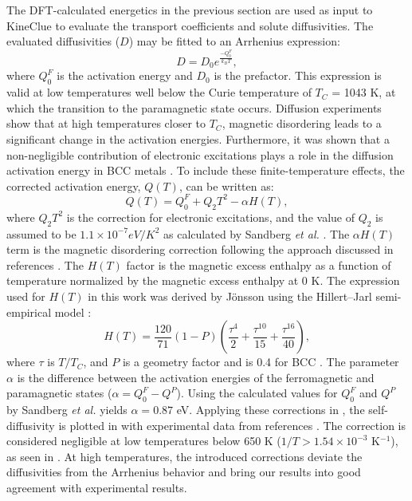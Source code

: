 \documentclass[preprint,12pt]{elsarticle}
\begin{document}
\noindent The DFT-calculated energetics in the previous section are used as input to KineClue \cite{schuler_kineclue_2020} to evaluate the transport coefficients and solute diffusivities. The evaluated diffusivities ($D$) may be fitted to an Arrhenius expression:
\begin{equation}
    D = D_0 e^{\frac{-Q_0^F}{k_B T}},
\end{equation}
where $Q_0^F$ is the activation energy and $D_0$ is the prefactor. This expression is valid at low temperatures well below the Curie temperature of $T_C$ = 1043 K, at which the transition to the paramagnetic state occurs. Diffusion experiments \cite{lubbehusen1990self, hettich1977self} show that at high temperatures closer to $T_C$, magnetic disordering leads to a significant change in the activation energies. Furthermore, it was shown that a non-negligible contribution of electronic excitations plays a role in the diffusion activation energy in BCC metals \cite{satta1998vacancy, sandberg2015modeling}. To include these finite-temperature effects, the corrected activation energy, $Q(T)$, can be written as:
\begin{equation}
\label{eq:corrected_Q}
    Q(T) = Q_0^F + Q_2T^2 -\alpha H(T),
\end{equation}
where $Q_2T^2$ is the correction for electronic excitations, and the value of $Q_2$ is assumed to be $1.1 \times 10^{-7} eV/K^2$ as calculated by Sandberg \textit{et al.} \cite{sandberg2015modeling}. The $\alpha H(T)$ term is the magnetic disordering correction following the approach discussed in references \cite{messina_systematic_2016, jonsson1992ferromagnetic}. The $H(T)$ factor is the magnetic excess enthalpy as a function of temperature normalized by the magnetic excess enthalpy at 0 K. The expression used for $H(T)$ in this work was derived by J\"{o}nsson \cite{jonsson1992ferromagnetic} using the Hillert--Jarl semi-empirical model \cite{hillert1978model}:
\begin{equation}
    H(T)=\frac{120}{71}(1-P)(\frac{\tau^{4}}{2}+\frac{\tau^{10}}{15}+\frac{\tau^{16}}{40}),
\end{equation}
where $\tau$ is $T/T_C$, and $P$ is a geometry factor and is 0.4 for BCC \cite{jonsson1992ferromagnetic}. The parameter $\alpha$ is the difference between the activation energies of the ferromagnetic and paramagnetic states ($\alpha = Q^F_0-Q^P$). Using the calculated values for $Q^F_0$ and $Q^P$ by Sandberg \textit{et al.}\cite{sandberg2015modeling} yields $\alpha = 0.87$ eV.
Applying these corrections in , the self-diffusivity is plotted in   with experimental data from references \cite{lubbehusen1990self, hettich1977self}. The correction is considered negligible at low temperatures below 650 K ($1/T > 1.54 \times 10^{-3}$ K$^{-1}$), as seen in . At high temperatures, the introduced corrections deviate the diffusivities from the Arrhenius behavior and bring our results into good agreement with experimental results. 
\end{document}
